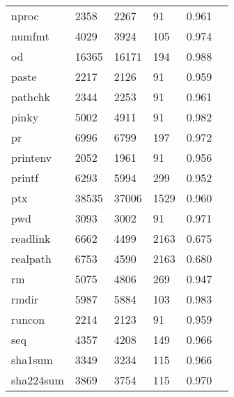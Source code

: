 \begin{longtable}{lp{2.40cm}p{2.40cm}p{2.40cm}p{2.40cm}p{2.40cm}}
nproc     &                     2358 &         2267 &            91 &                    0.961 \\
numfmt    &                     4029 &         3924 &           105 &                    0.974 \\
od        &                    16365 &        16171 &           194 &                    0.988 \\
paste     &                     2217 &         2126 &            91 &                    0.959 \\
pathchk   &                     2344 &         2253 &            91 &                    0.961 \\
pinky     &                     5002 &         4911 &            91 &                    0.982 \\
pr        &                     6996 &         6799 &           197 &                    0.972 \\
printenv  &                     2052 &         1961 &            91 &                    0.956 \\
printf    &                     6293 &         5994 &           299 &                    0.952 \\
ptx       &                    38535 &        37006 &          1529 &                    0.960 \\
pwd       &                     3093 &         3002 &            91 &                    0.971 \\
readlink  &                     6662 &         4499 &          2163 &                    0.675 \\
realpath  &                     6753 &         4590 &          2163 &                    0.680 \\
rm        &                     5075 &         4806 &           269 &                    0.947 \\
rmdir     &                     5987 &         5884 &           103 &                    0.983 \\
runcon    &                     2214 &         2123 &            91 &                    0.959 \\
seq       &                     4357 &         4208 &           149 &                    0.966 \\
sha1sum   &                     3349 &         3234 &           115 &                    0.966 \\
sha224sum &                     3869 &         3754 &           115 &                    0.970 \\

\end{longtable}
